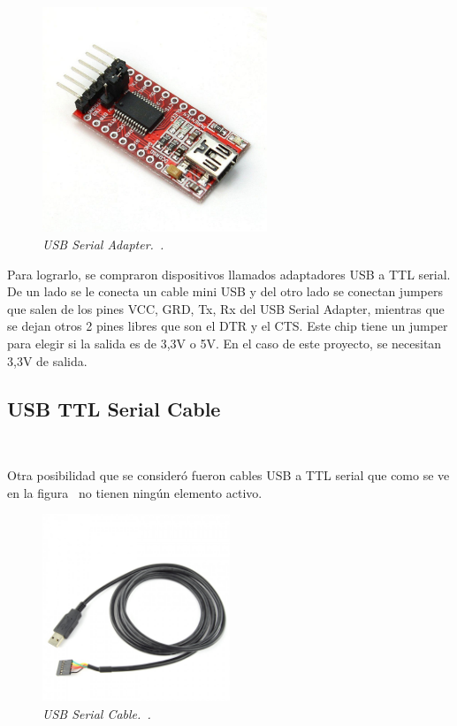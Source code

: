 \begin{figure}[h!]
  \centering
  \includegraphics[width=0.6\textwidth, keepaspectratio]{images/usb-serial-adapter}
  \caption{\textit{USB Serial Adapter.~\cite{USBSerialAdapter}.}}
  \label{fig:usb-serial-adapter}
\end{figure}

Para lograrlo, se compraron dispositivos llamados adaptadores USB a TTL serial. De un lado se le conecta un cable mini USB y del otro lado se conectan jumpers que salen de los pines VCC, GRD, Tx, Rx del USB Serial Adapter, mientras que se dejan otros 2 pines libres que son el DTR y el CTS. Este chip tiene un jumper para elegir si la salida es de 3,3V o 5V. En el caso de este proyecto, se necesitan 3,3V de salida.

\subsection{USB TTL Serial Cable} ~

Otra posibilidad que se consideró fueron cables USB a TTL serial que como se ve en la figura~ no tienen ningún elemento activo.

\begin{figure}[h!]
  \centering
  \includegraphics[width=0.5\textwidth, keepaspectratio]{images/usb-serial-cable}
  \caption{\textit{USB Serial Cable.~\cite{USBSerialCable}.}}
  \label{fig:usb-serial-cable}
\end{figure}

